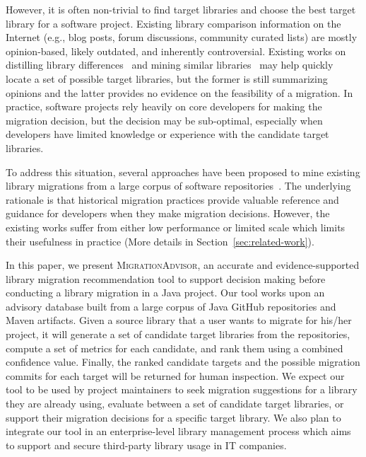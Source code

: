 \documentclass[conference,10pt]{IEEEtran}
\begin{document}
However, it is often non-trivial to find target libraries and choose the best target library for a software project. 
Existing library comparison information on the Internet (e.g., blog posts, forum discussions, community curated lists) are mostly opinion-based, likely outdated, and inherently controversial.
Existing works on distilling library differences~\cite{2020FSE-DiffTech} and mining similar libraries~\cite{chen2016similartech} may help quickly locate a set of possible target libraries, but the former is still summarizing opinions and the latter provides no evidence on the feasibility of a migration.
In practice, software projects rely heavily on core developers for making the migration decision, but the decision may be sub-optimal, especially when developers have limited knowledge or experience with the candidate target libraries.

To address this situation, several approaches have been proposed to mine existing library migrations from a large corpus of software repositories~\cite{teyton2012mining, teyton2014study, alrubaye2019migrationminer}.
The underlying rationale is that historical migration practices provide valuable reference and guidance for developers when they make migration decisions.
However, the existing works suffer from either low performance or limited scale which limits their usefulness in practice (More details in Section~\ref{sec:related-work}).

In this paper, we present \textsc{MigrationAdvisor}, an accurate and evidence-supported library migration recommendation tool to support decision making before conducting a library migration in a Java project.
Our tool works upon an advisory database built from a large corpus of Java GitHub repositories and Maven artifacts. 
Given a source library that a user wants to migrate for his/her project, it will generate a set of candidate target libraries from the repositories, compute a set of metrics for each candidate, and rank them using a combined confidence value. 
Finally, the ranked candidate targets and the possible migration commits for each target will be returned for human inspection.
We expect our tool to be used by project maintainers to seek migration suggestions for a library they are already using, evaluate between a set of candidate target libraries, or support their migration decisions for a specific target library. 
We also plan to integrate our tool in an enterprise-level library management process which aims to support and secure third-party library usage in IT companies.
\end{document}
